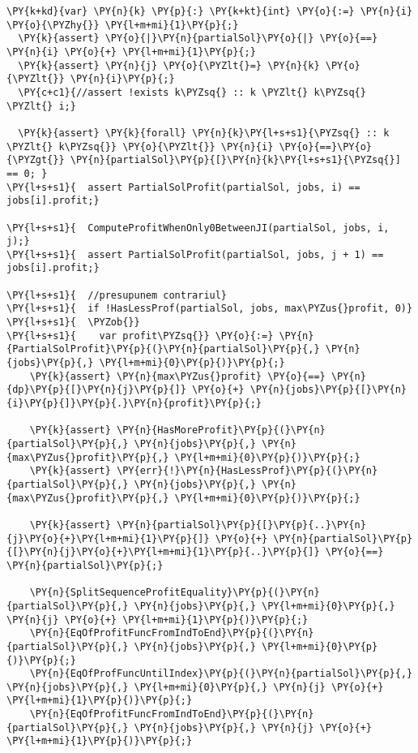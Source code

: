 \begin{Verbatim}[commandchars=\\\{\},fontsize=\small]
  \PY{k+kd}{var} \PY{n}{k} \PY{p}{:} \PY{k+kt}{int} \PY{o}{:=} \PY{n}{i} \PY{o}{\PYZhy{}} \PY{l+m+mi}{1}\PY{p}{;}
  \PY{k}{assert} \PY{o}{|}\PY{n}{partialSol}\PY{o}{|} \PY{o}{==} \PY{n}{i} \PY{o}{+} \PY{l+m+mi}{1}\PY{p}{;}
  \PY{k}{assert} \PY{n}{j} \PY{o}{\PYZlt{}=} \PY{n}{k} \PY{o}{\PYZlt{}} \PY{n}{i}\PY{p}{;}
  \PY{c+c1}{//assert !exists k\PYZsq{} :: k \PYZlt{} k\PYZsq{} \PYZlt{} i;}

  \PY{k}{assert} \PY{k}{forall} \PY{n}{k}\PY{l+s+s1}{\PYZsq{} :: k \PYZlt{} k\PYZsq{}} \PY{o}{\PYZlt{}} \PY{n}{i} \PY{o}{==}\PY{o}{\PYZgt{}} \PY{n}{partialSol}\PY{p}{[}\PY{n}{k}\PY{l+s+s1}{\PYZsq{}] == 0; }
\PY{l+s+s1}{  assert PartialSolProfit(partialSol, jobs, i) == jobs[i].profit;}

\PY{l+s+s1}{  ComputeProfitWhenOnly0BetweenJI(partialSol, jobs, i, j);}
\PY{l+s+s1}{  assert PartialSolProfit(partialSol, jobs, j + 1) == jobs[i].profit;}

\PY{l+s+s1}{  //presupunem contrariul}
\PY{l+s+s1}{  if !HasLessProf(partialSol, jobs, max\PYZus{}profit, 0)}
\PY{l+s+s1}{  \PYZob{}}
\PY{l+s+s1}{    var profit\PYZsq{}} \PY{o}{:=} \PY{n}{PartialSolProfit}\PY{p}{(}\PY{n}{partialSol}\PY{p}{,} \PY{n}{jobs}\PY{p}{,} \PY{l+m+mi}{0}\PY{p}{)}\PY{p}{;}
    \PY{k}{assert} \PY{n}{max\PYZus{}profit} \PY{o}{==} \PY{n}{dp}\PY{p}{[}\PY{n}{j}\PY{p}{]} \PY{o}{+} \PY{n}{jobs}\PY{p}{[}\PY{n}{i}\PY{p}{]}\PY{p}{.}\PY{n}{profit}\PY{p}{;}

    \PY{k}{assert} \PY{n}{HasMoreProfit}\PY{p}{(}\PY{n}{partialSol}\PY{p}{,} \PY{n}{jobs}\PY{p}{,} \PY{n}{max\PYZus{}profit}\PY{p}{,} \PY{l+m+mi}{0}\PY{p}{)}\PY{p}{;}
    \PY{k}{assert} \PY{err}{!}\PY{n}{HasLessProf}\PY{p}{(}\PY{n}{partialSol}\PY{p}{,} \PY{n}{jobs}\PY{p}{,} \PY{n}{max\PYZus{}profit}\PY{p}{,} \PY{l+m+mi}{0}\PY{p}{)}\PY{p}{;}

    \PY{k}{assert} \PY{n}{partialSol}\PY{p}{[}\PY{p}{..}\PY{n}{j}\PY{o}{+}\PY{l+m+mi}{1}\PY{p}{]} \PY{o}{+} \PY{n}{partialSol}\PY{p}{[}\PY{n}{j}\PY{o}{+}\PY{l+m+mi}{1}\PY{p}{..}\PY{p}{]} \PY{o}{==} \PY{n}{partialSol}\PY{p}{;}
    
    \PY{n}{SplitSequenceProfitEquality}\PY{p}{(}\PY{n}{partialSol}\PY{p}{,} \PY{n}{jobs}\PY{p}{,} \PY{l+m+mi}{0}\PY{p}{,} \PY{n}{j} \PY{o}{+} \PY{l+m+mi}{1}\PY{p}{)}\PY{p}{;}
    \PY{n}{EqOfProfitFuncFromIndToEnd}\PY{p}{(}\PY{n}{partialSol}\PY{p}{,} \PY{n}{jobs}\PY{p}{,} \PY{l+m+mi}{0}\PY{p}{)}\PY{p}{;}
    \PY{n}{EqOfProfFuncUntilIndex}\PY{p}{(}\PY{n}{partialSol}\PY{p}{,} \PY{n}{jobs}\PY{p}{,} \PY{l+m+mi}{0}\PY{p}{,} \PY{n}{j} \PY{o}{+} \PY{l+m+mi}{1}\PY{p}{)}\PY{p}{;}
    \PY{n}{EqOfProfitFuncFromIndToEnd}\PY{p}{(}\PY{n}{partialSol}\PY{p}{,} \PY{n}{jobs}\PY{p}{,} \PY{n}{j} \PY{o}{+} \PY{l+m+mi}{1}\PY{p}{)}\PY{p}{;}


\end{Verbatim}
